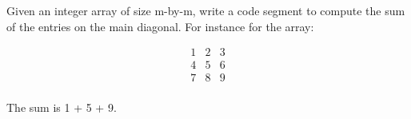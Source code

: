 \begin{ex}
Given an integer array of size m-by-m, write a code segment to compute the sum of the entries on the main diagonal. For instance for the array:

\begin{align*}
1 & 2 & 3 \\
4 & 5 & 6 \\
7 & 8 & 9 \\
\end{align*}

The sum is 1 + 5 + 9.
\end{ex}
